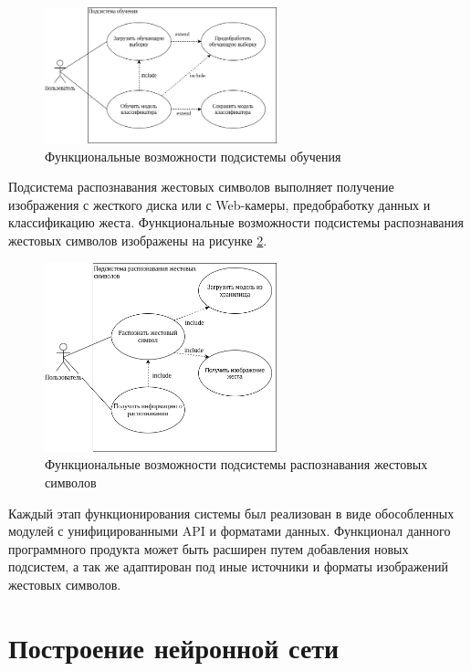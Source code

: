 \begin{figure}[!h]
	\centering
	\includegraphics[width=0.6\textwidth]{inc/img/train_func}
	\caption{Функциональные возможности подсистемы обучения}
	\label{impl:train_func}
\end{figure}

Подсистема распознавания жестовых символов выполняет получение изображения с жесткого диска или с Web-камеры, предобработку данных и классификацию жеста. Функциональные возможности подсистемы распознавания жестовых символов изображены на рисунке \ref{impl:run_func}.

\begin{figure}[!h]
	\centering
	\includegraphics[width=0.6\textwidth]{inc/img/run_test}
	\caption{Функциональные возможности подсистемы распознавания жестовых символов}
	\label{impl:run_func}
\end{figure}

Каждый этап функционирования системы был реализован в виде обособленных модулей с унифицированными API и форматами данных. Функционал данного программного продукта может быть расширен путем добавления новых подсистем, а так же адаптирован под иные источники и форматы изображений жестовых символов.

\section{Построение нейронной сети}

